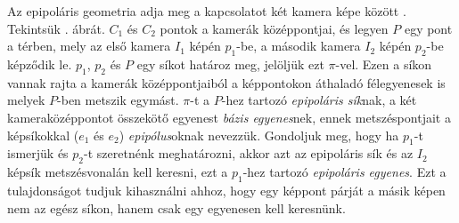 Az epipoláris geometria adja meg a kapcsolatot két kamera képe között \cite[9. fejezet]{HZ}. Tekintsük . ábrát. $C_1$ és $C_2$ pontok a kamerák középpontjai, és legyen $P$ egy pont a térben, mely az első kamera $I_1$ képén $p_1$-be, a második kamera $I_2$ képén $p_2$-be képződik le. $p_1$, $p_2$ és $P$ egy síkot határoz meg, jelöljük ezt $\pi$-vel. Ezen a síkon vannak rajta a kamerák középpontjaiból a képpontokon áthaladó félegyenesek is melyek $P$-ben metszik egymást. $\pi$-t a $P$-hez tartozó \textit{epipoláris sík}nak, a két kameraközéppontot összekötő egyenest \textit{bázis egyenes}nek, ennek metszéspontjait a képsíkokkal ($e_1$ és $e_2$) \textit{epipólus}oknak nevezzük. Gondoljuk meg, hogy ha $p_1$-t ismerjük és $p_2$-t szeretnénk meghatározni, akkor azt az epipoláris sík és az $I_2$ képsík metszésvonalán kell keresni, ezt a $p_1$-hez tartozó \textit{epipoláris egyenes}. Ezt a tulajdonságot tudjuk kihasználni ahhoz, hogy egy képpont párját a másik képen nem az egész síkon, hanem csak egy egyenesen kell keresnünk.


